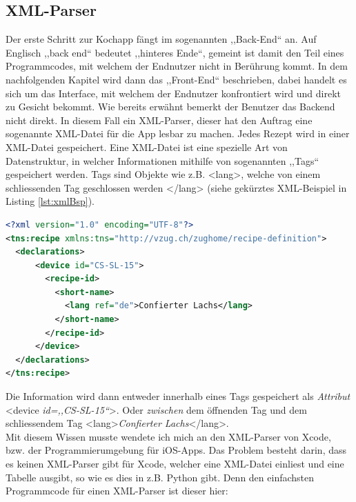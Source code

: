 \documentclass[12pt]{article}
\begin{document}
\subsection{XML-Parser}
Der erste Schritt zur Kochapp fängt im sogenannten ,,Back-End`` an. Auf Englisch ,,back end`` bedeutet ,,hinteres Ende``, gemeint ist damit den Teil eines Programmcodes, mit welchem der Endnutzer nicht in Berührung kommt. In dem nachfolgenden Kapitel wird dann das ,,Front-End`` beschrieben, dabei handelt es sich um das Interface, mit welchem der Endnutzer konfrontiert wird und direkt zu Gesicht bekommt. Wie bereits erwähnt bemerkt der Benutzer das Backend nicht direkt. In diesem Fall ein XML-Parser, dieser hat den Auftrag eine sogenannte XML-Datei für die App lesbar zu machen. Jedes Rezept wird in einer XML-Datei gespeichert. Eine XML-Datei ist eine spezielle Art von Datenstruktur, in welcher Informationen mithilfe von sogenannten ,,Tags`` gespeichert werden. Tags sind Objekte wie z.B. \colorbox{backcolour}{<lang>}, welche von einem schliessenden Tag geschlossen werden \colorbox{backcolour}{</lang>} (siehe gekürztes XML-Beispiel in Listing \ref{lst:xmlBsp}). \cite{bray2000extensible}
\begin{lstlisting}[language=XML,caption={XML-Beispiel gekürzt, Quelle: VZUG AG},label={lst:xmlBsp}]
<?xml version="1.0" encoding="UTF-8"?>
<tns:recipe xmlns:tns="http://vzug.ch/zughome/recipe-definition">
  <declarations>
      <device id="CS-SL-15">
        <recipe-id>
          <short-name>
            <lang ref="de">Confierter Lachs</lang>
          </short-name>
        </recipe-id>
      </device>
  </declarations>
</tns:recipe>
\end{lstlisting}
Die Information wird dann entweder innerhalb eines Tags gespeichert als \textit{Attribut} \colorbox{backcolour}{<device \textit{id=,,CS-SL-15``}>}. Oder \textit{zwischen} dem öffnenden Tag und dem schliessendem Tag \colorbox{backcolour}{<lang>\textit{Confierter Lachs}</lang>}. \\ Mit diesem Wissen musste wendete ich mich an den XML-Parser von Xcode, bzw. der Programmierumgebung für iOS-Apps. Das Problem besteht darin, dass es keinen XML-Parser gibt für Xcode, welcher eine XML-Datei einliest und eine Tabelle ausgibt, so wie es dies in z.B. Python gibt. Denn den einfachsten Programmcode für einen XML-Parser ist dieser hier:
\end{document}
